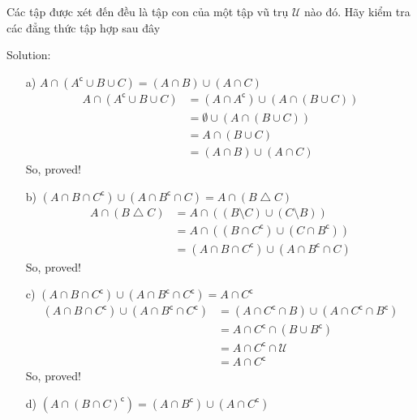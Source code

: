 \newpage
\begin{longfbox}
      \begin{bt} \label{pro:practice1.5}
            Các tập được xét đến đều là tập con của một tập vũ trụ $\mathcal U$ nào đó. Hãy kiểm tra các đẳng thức tập hợp sau đây
      \end{bt}
\end{longfbox}

Solution:
\begin{enumerate}
\item[a)] $A\cap (A^\mathsf{c}\cup B\cup C) = (A\cap B)\cup(A\cap C)$ \\
      \begin{align}
            A\cap (A^\mathsf{c}\cup B\cup C)
            &= (A\cap A^\mathsf{c})\cup (A\cap(B\cup C)) \\
            &= \emptyset\cup(A\cap(B\cup C)) \\
            &= A\cap(B\cup C) \\
            &= (A\cap B)\cup(A\cap C)
      \end{align} 
      So, proved!
\item[b)] $(A\cap B\cap C^\mathsf{c})\cup(A\cap B^\mathsf{c}\cap C) = A\cap (B\bigtriangleup C)$ \\
      \begin{align}
            A\cap (B\bigtriangleup C)
            &= A\cap((B\setminus C)\cup(C\setminus B)) \\
            &= A\cap((B\cap C^\mathsf{c})\cup(C\cap B^\mathsf{c})) \\
            &= (A\cap B\cap C^\mathsf{c})\cup(A\cap B^\mathsf{c}\cap C)
      \end{align} 
      So, proved!
\item[c)] $(A\cap B\cap C^\mathsf{c})\cup(A\cap B^\mathsf{c}\cap C^\mathsf{c}) = A\cap C^\mathsf{c}$ \\
      \begin{align}
            (A\cap B\cap C^\mathsf{c})\cup(A\cap B^\mathsf{c}\cap C^\mathsf{c})
            &= (A\cap C^\mathsf{c}\cap B)\cup(A\cap C^\mathsf{c}\cap B^\mathsf{c}) \\
            &= A\cap C^\mathsf{c}\cap(B\cup B^\mathsf{c}) \\
            &= A\cap C^\mathsf{c}\cap\mathcal U \\
            &= A\cap C^\mathsf{c}
      \end{align} 
      So, proved!
\item[d)] $(A\cap(B\cap C)^\mathsf{c}) = (A\cap B^\mathsf{c})\cup(A\cap C^\mathsf{c})$ \\

\end{enumerate}
